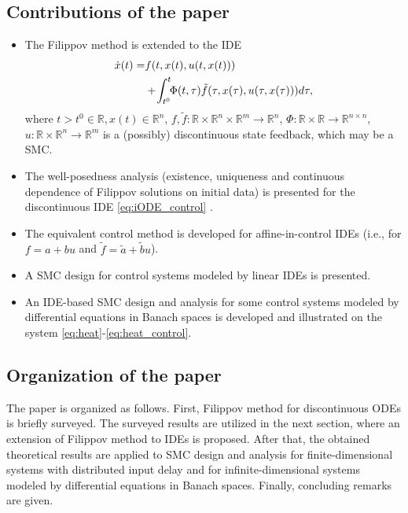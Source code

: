 \documentclass{article}
\newcommand{\R}{\mathbb{R}}
\begin{document}
\subsection{Contributions of the paper}
\begin{itemize}
\item The Filippov method is extended to the IDE\vspace{-1mm}
\begin{equation}\label{eq:iODE_control}
\begin{split}
	\dot x(t)=&f(t,x(t),u(t,x(t)))\\
	&+\!\int^t_{t^0}\!\!\Phi(t,\tau) \tilde f(\tau,x(\tau),u(\tau,x(\tau))) d\tau,\vspace{-1mm}
\end{split}
\end{equation}  
where $t>t^0\in \R, x(t)\in \R^n$,  $f,\tilde f:\R\times \R^n\times \R^m\to \R^n$,{ $\Phi: \R\times \R\to \R^{n\times n}$}, $u:\R\times \R^n\to \R^m$ is a  (possibly) discontinuous  state feedback, which may be a SMC.
\item 
 The well-posedness analysis (existence, uniqueness and continuous dependence  of Filippov solutions on initial data)  is presented for the discontinuous IDE \eqref{eq:iODE_control} . 
\item The equivalent control method is developed for affine-in-control IDEs (i.e., for $f=a+bu$ and $\tilde f=\tilde a+\tilde bu$).
\item  A SMC  design for   control systems modeled by linear IDEs  is presented.
\item An IDE-based  SMC design and analysis for
some control systems modeled by differential equations in Banach spaces  is developed and illustrated on the system \eqref{eq:heat}-\eqref{eq:heat_control}.
\end{itemize}\vspace{-4mm}
\subsection{Organization of the paper}
The paper is organized as follows. First,  Filippov method for discontinuous ODEs is  briefly surveyed. The  surveyed results are utilized in the next section, where an extension of Filippov method  to IDEs is proposed. After that, the obtained theoretical results are applied to SMC design and analysis for finite-dimensional systems with distributed input delay and {for  infinite-dimensional systems modeled by differential equations in Banach spaces}. Finally, concluding remarks are given. 
\end{document}
